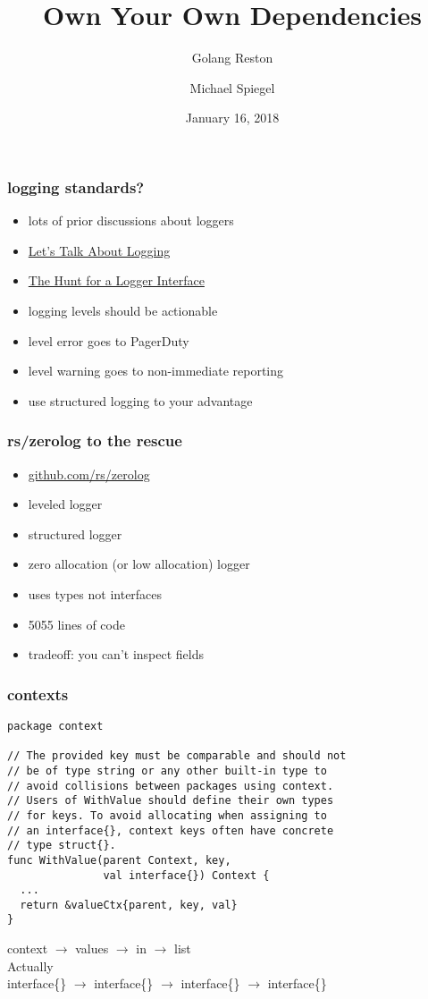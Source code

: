 \documentclass{beamer}
\title{Own Your Own Dependencies}
\subtitle{Golang Reston}
\author{Michael Spiegel}
\date{January 16, 2018}
\begin{document}
\begin{frame}
\titlepage
\end{frame}

\begin{frame}
\frametitle{logging standards?}
\begin{itemize}
\item lots of prior discussions about loggers
\item \href{https://dave.cheney.net/2015/11/05/lets-talk-about-logging}{Let's Talk About Logging}
\item \href{https://go-talks.appspot.com/github.com/ChrisHines/talks/structured-logging/structured-logging.slide}{The Hunt for a Logger Interface}
\item logging levels should be actionable
\item level error goes to PagerDuty
\item level warning goes to non-immediate reporting
\item use structured logging to your advantage
\end{itemize}
\end{frame}

\begin{frame}
\frametitle{rs/zerolog to the rescue}
\begin{itemize}
\item \href{https://github.com/rs/zerolog}{github.com/rs/zerolog}
\item leveled logger
\item structured logger
\item zero allocation (or low allocation) logger
\item uses types not interfaces
\item 5055 lines of code
\item tradeoff: you can't inspect fields
\end{itemize}
\end{frame}

\begin{frame}[fragile]
\frametitle{contexts}
\begin{lstlisting}[basicstyle=\ttfamily\footnotesize]
package context

// The provided key must be comparable and should not
// be of type string or any other built-in type to
// avoid collisions between packages using context.
// Users of WithValue should define their own types
// for keys. To avoid allocating when assigning to
// an interface{}, context keys often have concrete
// type struct{}.
func WithValue(parent Context, key,
               val interface{}) Context {
  ...
  return &valueCtx{parent, key, val}
}
\end{lstlisting}
context $\rightarrow$ values $\rightarrow$ in $\rightarrow$ list \\
\pause
Actually \\
interface\{\} $\rightarrow$ interface\{\} $\rightarrow$ interface\{\}
$\rightarrow$ interface\{\}
\end{frame}
\end{document}
